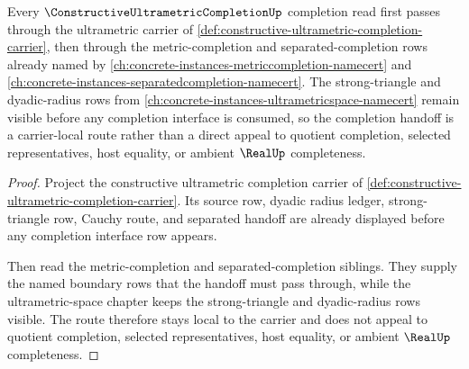 \begin{theorem}
\label{thm:constructive-ultrametric-completion-cauchy-completion-dependency}
Every $\ConstructiveUltrametricCompletionUp$ completion read first passes through the ultrametric carrier of \autoref{def:constructive-ultrametric-completion-carrier}, then through the metric-completion and separated-completion rows already named by \autoref{ch:concrete-instances-metriccompletion-namecert} and \autoref{ch:concrete-instances-separatedcompletion-namecert}. The strong-triangle and dyadic-radius rows from \autoref{ch:concrete-instances-ultrametricspace-namecert} remain visible before any completion interface is consumed, so the completion handoff is a carrier-local route rather than a direct appeal to quotient completion, selected representatives, host equality, or ambient $\RealUp$ completeness.
\end{theorem}
\begin{proof}
Project the constructive ultrametric completion carrier of \autoref{def:constructive-ultrametric-completion-carrier}. Its source row, dyadic radius ledger, strong-triangle row, Cauchy route, and separated handoff are already displayed before any completion interface row appears.

Then read the metric-completion and separated-completion siblings. They supply the named boundary rows that the handoff must pass through, while the ultrametric-space chapter keeps the strong-triangle and dyadic-radius rows visible. The route therefore stays local to the carrier and does not appeal to quotient completion, selected representatives, host equality, or ambient $\RealUp$ completeness.
\end{proof}
